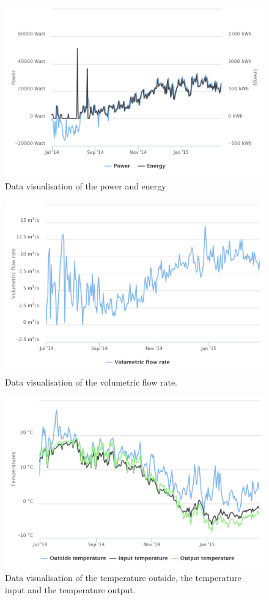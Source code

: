 \documentclass{scrartcl}
\begin{document}
\begin{figure}[H]
  \centering
  \includegraphics[width=0.8\linewidth]{img/powerenergy.png}
  \caption{Data visualisation of the power and energy}
  \label{fig:powerenergy}
\end{figure}

\begin{figure}[H]
  \centering
  \includegraphics[width=0.8\linewidth]{img/Volumetric_flow.png}
  \caption{Data visualisation of the volumetric flow rate.}
  \label{fig:volumetric_flow}
\end{figure}

\begin{figure}[H]
  \centering
  \includegraphics[width=0.8\linewidth]{img/Temperatures.png}
  \caption{Data visualisation of the temperature outside, the temperature input and the temperature output.}
  \label{fig:temperatures}
\end{figure}
\end{document}
